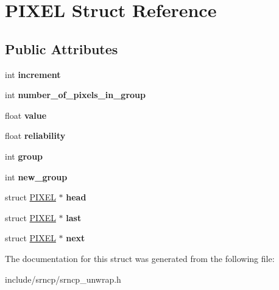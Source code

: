 \hypertarget{struct_p_i_x_e_l}{\section{P\-I\-X\-E\-L Struct Reference}
\label{struct_p_i_x_e_l}
}
\subsection*{Public Attributes}
\begin{DoxyCompactItemize}
\item 
\hypertarget{struct_p_i_x_e_l_af8ced9ca3342f6d0fecbd4925bb4c62b}{int {\bfseries increment}}\label{struct_p_i_x_e_l_af8ced9ca3342f6d0fecbd4925bb4c62b}

\item 
\hypertarget{struct_p_i_x_e_l_a95ed27bafd239313e789998c59a7ca18}{int {\bfseries number\-\_\-of\-\_\-pixels\-\_\-in\-\_\-group}}\label{struct_p_i_x_e_l_a95ed27bafd239313e789998c59a7ca18}

\item 
\hypertarget{struct_p_i_x_e_l_afb696d11884328d3023274607b1c879d}{float {\bfseries value}}\label{struct_p_i_x_e_l_afb696d11884328d3023274607b1c879d}

\item 
\hypertarget{struct_p_i_x_e_l_a6d48d8353caf61a48d4219eadbb3f9db}{float {\bfseries reliability}}\label{struct_p_i_x_e_l_a6d48d8353caf61a48d4219eadbb3f9db}

\item 
\hypertarget{struct_p_i_x_e_l_a56925a4105feb07e5960df08a2a4b085}{int {\bfseries group}}\label{struct_p_i_x_e_l_a56925a4105feb07e5960df08a2a4b085}

\item 
\hypertarget{struct_p_i_x_e_l_a32322b80f38ec554722805c2544e5e63}{int {\bfseries new\-\_\-group}}\label{struct_p_i_x_e_l_a32322b80f38ec554722805c2544e5e63}

\item 
\hypertarget{struct_p_i_x_e_l_ace70c69fab3209527a85c5019d343b5f}{struct \hyperlink{struct_p_i_x_e_l}{P\-I\-X\-E\-L} $\ast$ {\bfseries head}}\label{struct_p_i_x_e_l_ace70c69fab3209527a85c5019d343b5f}

\item 
\hypertarget{struct_p_i_x_e_l_acc7295b17faa43230c5e4f2924c2981b}{struct \hyperlink{struct_p_i_x_e_l}{P\-I\-X\-E\-L} $\ast$ {\bfseries last}}\label{struct_p_i_x_e_l_acc7295b17faa43230c5e4f2924c2981b}

\item 
\hypertarget{struct_p_i_x_e_l_a30381a661bf0f90c628a647802987955}{struct \hyperlink{struct_p_i_x_e_l}{P\-I\-X\-E\-L} $\ast$ {\bfseries next}}\label{struct_p_i_x_e_l_a30381a661bf0f90c628a647802987955}

\end{DoxyCompactItemize}


The documentation for this struct was generated from the following file\-:\begin{DoxyCompactItemize}
\item 
include/srncp/srncp\-\_\-unwrap.\-h\end{DoxyCompactItemize}
